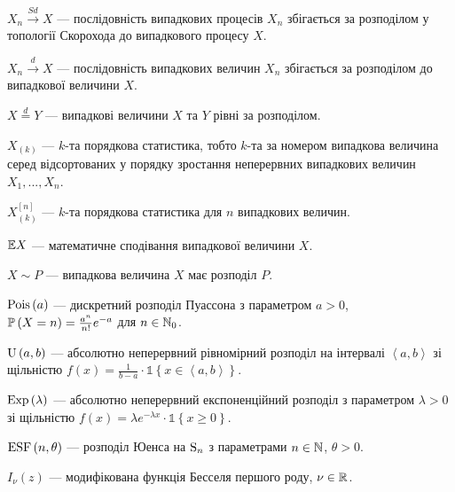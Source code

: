 $X_n \overset{Sd}{\longrightarrow} X$ --- послідовність випадкових процесів $X_n$
збігається за розподілом у топології Скорохода до випадкового процесу $X$.

$X_n \overset{d}{\longrightarrow} X$ --- послідовність випадкових величин $X_n$
збігається за розподілом до випадкової величини $X$.

$X \overset{d}{=} Y$ --- випадкові величини $X$ та $Y$ рівні за розподілом.

$X_{(k)}$ --- $k$-та порядкова статистика, тобто $k$-та за номером 
випадкова величина серед відсортованих у порядку зростання неперервних
випадкових величин $X_1, ..., X_n$.

$X_{(k)}^{[n]}$ --- $k$-та порядкова статистика для $n$ випадкових величин.

$\E X$ --- математичне сподівання випадкової величини $X$.

$X \sim P$ --- випадкова величина $X$ має розподіл $P$.

$\Poiss{a}$ --- дискретний розподіл Пуассона з параметром $a > 0$, $\P{X = n} = \frac{a^n}{n!}e^{-a}$ для $n \in \N_0$.

$\Unif{a, b}$ --- абсолютно неперервний рівномірний розподіл на інтервалі $\left<a,b\right>$ зі щільністю
$f(x) = \frac{1}{b-a} \cdot \mathds{1}\left\{x \in \left<a,b\right> \right\}$.

$\Exp{\lambda}$ --- абсолютно неперервний експоненційний розподіл з параметром $\lambda > 0$ зі щільністю
$f(x) = \lambda e^{-\lambda x} \cdot \mathds{1}\left\{x \geq 0\right\}$.

$\ESF{n, \theta}$ --- розподіл Юенса на $\Sym{n}$ з параметрами $n \in \N$, $\theta > 0$.

$I_{\nu}(z)$ --- модифікована функція Бесселя першого роду, $\nu \in \R$.